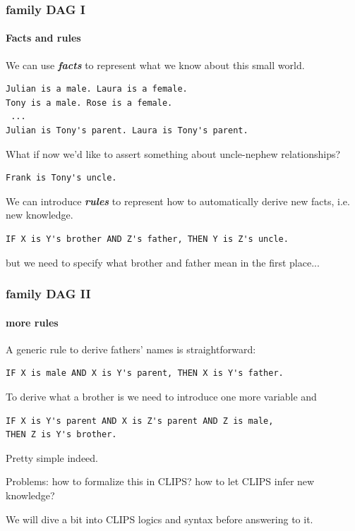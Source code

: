 \documentclass[xcolor={usenames,dvipsnames,svgnames}, compress]{beamer}
\begin{document}
\begin{frame}
  \frametitle{family DAG I}
  \framesubtitle{Facts and rules}
  We can use \emph{\textbf{facts}} to represent what we know about this small
  world.
{\color{violent-green}\begin{verbatim}
Julian is a male. Laura is a female.
Tony is a male. Rose is a female.
 ...
Julian is Tony's parent. Laura is Tony's parent.
\end{verbatim}}
  What if now we'd like to assert something about uncle-nephew
  relationships?
{\color{violent-green}\begin{verbatim}
Frank is Tony's uncle.
\end{verbatim}}
  We can introduce \emph{\textbf{rules}} to represent how to automatically derive new
  facts, i.e. new knowledge.
{\color{ny-orange}\begin{verbatim}
IF X is Y's brother AND Z's father, THEN Y is Z's uncle.
\end{verbatim}}
  but we need to specify what brother and father mean in the first
  place... 
\end{frame}

\begin{frame}
  \frametitle{family DAG II}
  \framesubtitle{more rules}
  
  A generic rule to derive fathers' names is straightforward:
  {\color{ny-orange}\begin{verbatim}
IF X is male AND X is Y's parent, THEN X is Y's father.
\end{verbatim}}
  
  To derive what a brother is we need to introduce one more variable
  and 
  {\color{ny-orange}\begin{verbatim}
IF X is Y's parent AND X is Z's parent AND Z is male,
THEN Z is Y's brother.
\end{verbatim}}
  
  
  Pretty simple indeed.\par\bigskip
  
  Problems: how to formalize this in CLIPS? how to let CLIPS
  infer new knowledge?\par\bigskip
  
  We will dive a bit into CLIPS logics and syntax before answering to it.
  
\end{frame}
\end{document}
